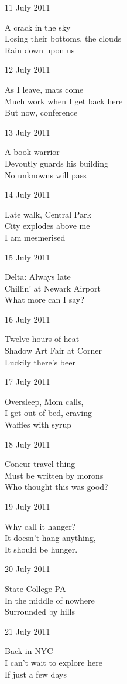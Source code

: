 \documentclass[12pt]{article}
\begin{document}
11 July 2011

A crack in the sky \\
Losing their bottoms, the clouds \\
Rain down upon us

12 July 2011

As I leave, mats come \\
Much work when I get back here \\
But now, conference

13 July 2011

A book warrior \\
Devoutly guards his building \\
No unknowns will pass

14 July 2011

Late walk, Central Park \\
City explodes above me \\
I am mesmerised

15 July 2011

Delta: Always late \\
Chillin' at Newark Airport \\
What more can I say?

\newpage

16 July 2011

Twelve hours of heat \\
Shadow Art Fair at Corner \\
Luckily there's beer

17 July 2011

Oversleep, Mom calls, \\
I get out of bed, craving \\
Waffles with syrup

18 July 2011

Concur travel thing \\
Must be written by morons \\
Who thought this was good?

19 July 2011

Why call it hanger? \\
It doesn't hang anything, \\
It should be hunger.

20 July 2011

State College PA \\
In the middle of nowhere \\
Surrounded by hills

21 July 2011

Back in NYC \\
I can't wait to explore here \\
If just a few days
\end{document}
